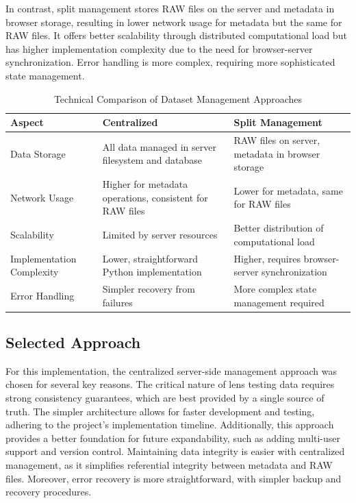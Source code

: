In contrast, split management stores RAW files on the server and metadata in browser storage, resulting in lower network usage for metadata but the same for RAW files. It offers better scalability through distributed computational load but has higher implementation complexity due to the need for browser-server synchronization. Error handling is more complex, requiring more sophisticated state management.

\begin{table}[h]
\centering
\begin{tabular}{|p{3cm}|p{5cm}|p{5cm}|}
\hline
\textbf{Aspect} & \textbf{Centralized} & \textbf{Split Management} \\
\hline
Data Storage & All data managed in server filesystem and database & RAW files on server, metadata in browser storage \\
\hline
Network Usage & Higher for metadata operations, consistent for RAW files & Lower for metadata, same for RAW files \\
\hline
Scalability & Limited by server resources & Better distribution of computational load \\
\hline
Implementation Complexity & Lower, straightforward Python implementation & Higher, requires browser-server synchronization \\
\hline
Error Handling & Simpler recovery from failures & More complex state management required \\
\hline
\end{tabular}
\caption{Technical Comparison of Dataset Management Approaches}
\label{table:dataset_comparison}
\end{table}

\subsection{Selected Approach}

For this implementation, the centralized server-side management approach was chosen for several key reasons. The critical nature of lens testing data requires strong consistency guarantees, which are best provided by a single source of truth. The simpler architecture allows for faster development and testing, adhering to the project's implementation timeline. Additionally, this approach provides a better foundation for future expandability, such as adding multi-user support and version control. Maintaining data integrity is easier with centralized management, as it simplifies referential integrity between metadata and RAW files. Moreover, error recovery is more straightforward, with simpler backup and recovery procedures.

